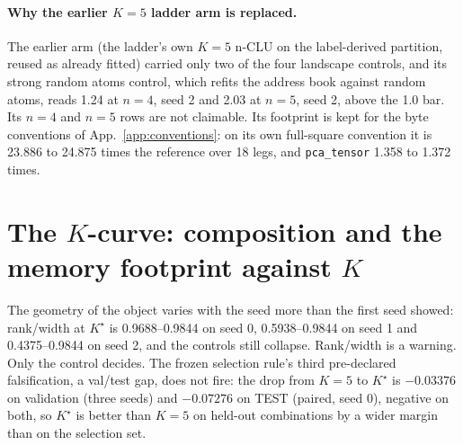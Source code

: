 \documentclass{article} %
\newcommand{\Kstar}{\ensuremath{K^{\star}}}
\begin{document}
\paragraph{Why the earlier $K=5$ ladder arm is replaced.} The earlier arm (the ladder's own
$K=5$ n-CLU on the label-derived partition, reused as already fitted) carried only two of the four
landscape controls, and its strong random atoms control, which refits the address book
against random atoms, reads 1.24 at $n=4$, seed 2 and 2.03 at $n=5$, seed 2, above the 1.0 bar. %
Its $n=4$ and $n=5$ rows are not claimable. Its footprint is kept for the byte conventions of
App.~\ref{app:conventions}: on its own full-square convention it is 23.886 to 24.875 times the %
reference over 18 legs, and \texttt{pca\_tensor} 1.358 to 1.372 times. %
\section{The $K$-curve: composition and the memory footprint against $K$}
\label{app:kcurve}

The geometry of the object varies with the seed more than the first seed showed:
rank/width at $\Kstar$ is 0.9688--0.9844 on seed 0, 0.5938--0.9844 on seed 1 and
0.4375--0.9844 on seed 2, and the controls still collapse. Rank/width is a warning. Only the
control decides. %
The frozen selection rule's third pre-declared falsification, a val/test gap, does not fire:
the drop from $K=5$ to $\Kstar$ is $-0.03376$ on validation (three seeds) and $-0.07276$ on
TEST (paired, seed 0), negative on both, so $\Kstar$ is better than $K=5$ on held-out combinations
by a wider margin than on the selection set. %
\end{document}
